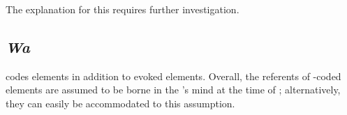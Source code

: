 The explanation for this requires further investigation.

 







\subsection{\textit{Wa}}\label{Wa}

 codes  elements in addition to evoked elements.
Overall, the referents of -coded elements are assumed to be
borne in the 's mind at the time of ; alternatively, they can easily be accommodated to this assumption.

